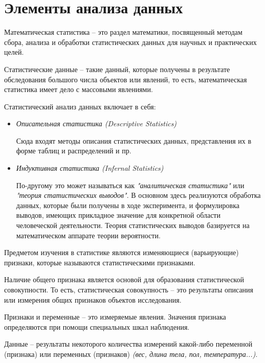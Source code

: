 \newpage
{}
\section*{Элементы анализа данных}
Математическая статистика -- это раздел математики, посвященный методам сбора, анализа и обработки статистических данных для научных и практических целей.

Статистические данные -- такие данный, которые получены в результате обследования большого числа объектов или явлений, то есть, математическая статистика имеет дело с массовыми явлениями.

Статистический анализ данных включает в себя:

\begin{itemize}
	\item \textit{Описательная статистика (Descriptive Statistics)}
	
	Сюда входят методы описания статистических данных, представления их в форме таблиц и распределений и пр.
	
	\item \textit{Индуктивная статистика (Infernal Statistics)}
	
	По-другому это может называться как \textit{"аналитическая статистика"} или \textit{"теория статистических выводов"}. В основном здесь реализуются обработка данных, которые были получены в ходе эксперимента, и формулировка выводов, имеющих прикладное значение для конкретной области человеческой деятельности. Теория статистических выводов базируется на математическом аппарате теории вероятности.
\end{itemize}

Предметом изучения в статистике являются изменяющиеся (варьирующие) признаки, которые называются статистическими признаками.

Наличие общего признака является основой для образования статистической совокупности. То есть, статистическая совокупность -- это результаты описания или измерения общих признаков объектов исследования.

Признаки и переменные -- это измеряемые явления. Значения признака определяются при помощи специальных шкал наблюдения. 

Данные -- результаты некоторого количества измерений какой-либо переменной (признака) или переменных (признаков) \textit{(вес, длина тела, пол, температура...)}.

